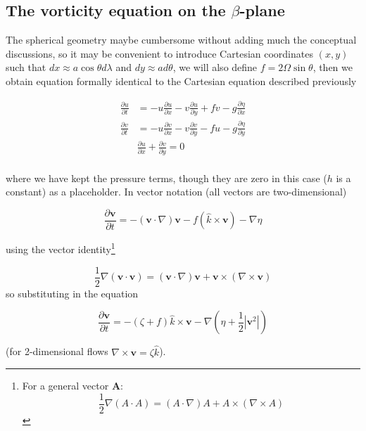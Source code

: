 \subsection{\texorpdfstring{The vorticity equation on the
    \(\beta\)-plane}{The vorticity equation on the \textbackslash beta-plane}}\label{the-vorticity-equation-on-the-beta-plane}

The spherical geometry maybe cumbersome without adding much the
conceptual discussions, so it may be convenient to introduce Cartesian
coordinates \((x,y)\) such that \(dx \approx a \cos\theta d \lambda\)
and \(dy \approx a d\theta\), we will also define
\(f= 2\Omega \sin\theta\), then we obtain equation formally identical to
the Cartesian equation described previously

\[\begin{aligned}
      \frac{\partial u}{\partial t} &= -u \frac{\partial u}{\partial x} -v \frac{\partial u}{\partial y} + f v -g\frac{\partial \eta}{\partial x} \\
      \frac{\partial v}{\partial t} &= -u \frac{\partial v}{\partial x} -v \frac{\partial v}{\partial y} - f u -g\frac{\partial \eta}{\partial y} \\
      &\frac{\partial u}{\partial x}+\frac{\partial v}{\partial y} = 0 \\
\end{aligned}\]

where we have kept the pressure terms, though they are zero in this case
($h$ is a constant) as a placeholder. In vector notation (all vectors are
two-dimensional)

\[\frac{\partial \mathbf{v}}{\partial t} = - (\mathbf{v} \cdot \nabla)\mathbf{v} - f(\hat{k}\times \mathbf{v}) - \nabla \eta\]

using the vector identity\footnote{For a general vector $\mathbf{A}$: \[\frac{1}{2}\nabla(A\cdot A) = (A \cdot\nabla)A + A\times(\nabla\times A)\]}


\[\frac{1}{2}\nabla(\mathbf{v}\cdot \mathbf{v}) = (\mathbf{v} \cdot\nabla)\mathbf{v} + \mathbf{v}\times(\nabla\times \mathbf{v})\]
so substituting in the equation

\begin{equation}\label{eq.21}
\frac{\partial \mathbf{v}}{\partial t} = -(\zeta + f) \hat{k}\times \mathbf{v} -\nabla(\eta+\frac{1}{2}|\mathbf{v}^2|)
\end{equation}

(for 2-dimensional flows \(\nabla \times \mathbf{v} = \zeta \hat{k}\)).

